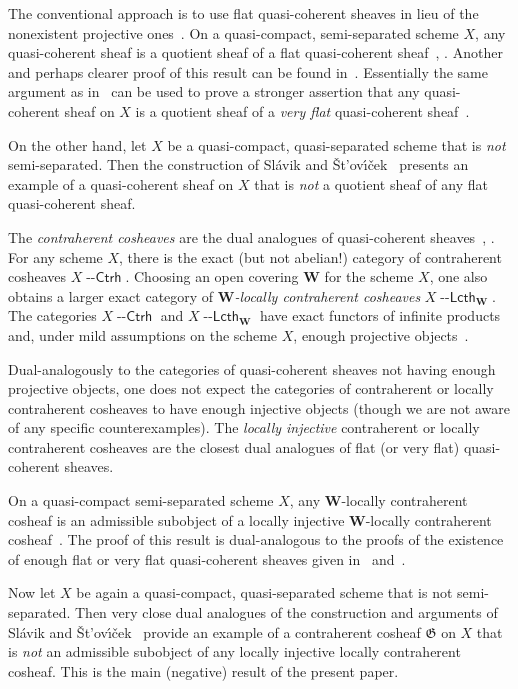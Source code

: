 \documentclass[12pt,a4paper]{amsart}
\newcommand{\+}{\nobreakdash-}
\renewcommand{\:}{\colon}
\newcommand{\Ctrh}{{\operatorname{\mathsf{--Ctrh}}}}
\newcommand{\Lcth}{{\operatorname{\mathsf{--Lcth}}}}
\newcommand{\bW}{\mathbf W}
\newcommand{\fG}{\mathfrak G}
\theoremstyle{plain}
\theoremstyle{definition}
\begin{document}
 The conventional approach is to use flat quasi-coherent sheaves in
lieu of the nonexistent projective ones~\cite{M-th}.
 On a quasi-compact, semi-separated scheme $X$, any quasi-coherent sheaf
is a quotient sheaf of a flat quasi-coherent
sheaf~\cite[Section~2.4]{M-n}, \cite[Section~3.2]{M-th}.
 Another and perhaps clearer proof of this result can be found
in~\cite[Lemma~A.1]{EP}.
 Essentially the same argument as in~\cite{EP} can be used to prove
a stronger assertion that any quasi-coherent sheaf on $X$ is
a quotient sheaf of a \emph{very flat} quasi-coherent
sheaf~\cite[Lemma~4.1.1]{Pcosh}.

 On the other hand, let $X$ be a quasi-compact, quasi-separated scheme
that is \emph{not} semi-separated.
 Then the construction of Sl\'avik and
\v St\!'ov\'\i\v cek~\cite[Theorem~2.2]{SS} presents an example of
a quasi-coherent sheaf on $X$ that is \emph{not} a quotient sheaf of
any flat quasi-coherent sheaf.

 The \emph{contraherent cosheaves} are the dual analogues of
quasi-coherent sheaves~\cite[Preface]{Pcosh}, \cite{Pphil}.
 For any scheme $X$, there is the exact (but not abelian!) category
of contraherent cosheaves $X\Ctrh$.
 Choosing an open covering $\bW$ for the scheme $X$, one also obtains
a larger exact category of \emph{$\bW$\+locally contraherent cosheaves}
$X\Lcth_\bW$.
 The categories $X\Ctrh$ and $X\Lcth_\bW$ have exact functors of
infinite products and, under mild assumptions on the scheme $X$,
enough projective objects~\cite[Section~0.18, Lemma~4.5.1,
and Corollary~6.2.4]{Pcosh}.

 Dual-analogously to the categories of quasi-coherent sheaves not
having enough projective objects, one does not expect the categories
of contraherent or locally contraherent cosheaves to have enough
injective objects (though we are not aware of any specific
counterexamples).
 The \emph{locally injective} contraherent or locally contraherent
cosheaves are the closest dual analogues of flat (or very flat)
quasi-coherent sheaves.

 On a quasi-compact semi-separated scheme $X$, any $\bW$\+locally
contraherent cosheaf is an admissible subobject of a locally injective
$\bW$\+locally contraherent cosheaf~\cite[Lemma~4.3.2(a)]{Pcosh}.
 The proof of this result is dual-analogous to the proofs of
the existence of enough flat or very flat quasi-coherent sheaves
given in~\cite[Lemma~A.1]{EP} and~\cite[Lemma~4.1.1]{Pcosh}.

 Now let $X$ be again a quasi-compact, quasi-separated scheme that is
not semi-separated.
 Then very close dual analogues of the construction and arguments of
Sl\'avik and \v St\!'ov\'\i\v cek~\cite[Section~2]{SS} provide
an example of a contraherent cosheaf $\fG$ on $X$ that is \emph{not}
an admissible subobject of any locally injective locally contraherent
cosheaf.
 This is the main (negative) result of the present paper.
\end{document}
